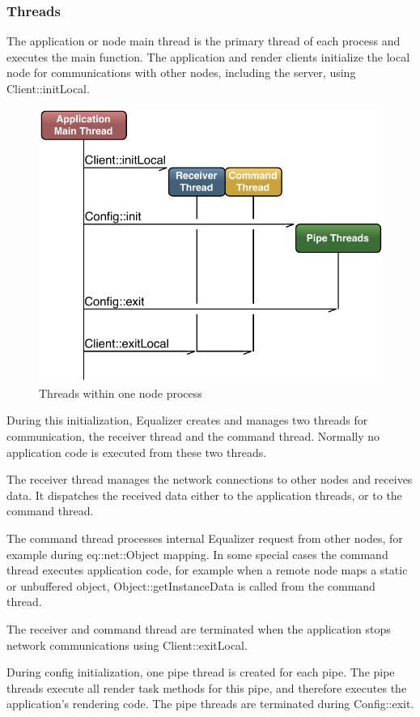\documentclass[10pt,a4]{scrartcl}
\begin{document}
\subsubsection{Threads}

The application or node main thread is the primary thread of each
process and executes the \textsf{main} function. The application and
render clients initialize the local node for communications with other
nodes, including the server, using \textsf{Client::initLocal}.

\begin{figure}
  \includegraphics[width=.618\textwidth]{images/threads.pdf}
  {\caption{\label{fThreads}Threads within one node process}}
\end{figure}
During this initialization, Equalizer creates and manages two threads
for communication, the receiver thread and the command thread. Normally
no application code is executed from these two threads.

The receiver thread manages the network connections to other nodes and
receives data. It dispatches the received data either to the application
threads, or to the command thread.

The command thread processes internal Equalizer request from other
nodes, for example during \textsf{eq::net::Object} mapping. In some
special cases the command thread executes application code, for example
when a remote node maps a static or unbuffered object,
\textsf{Object::getInstanceData} is called from the command thread.

The receiver and command thread are terminated when the application
stops network communications using \textsf{Client::exitLocal}.

During config initialization, one pipe thread is created for each
pipe. The pipe threads execute all render task methods for this pipe,
and therefore executes the application's rendering code. The pipe
threads are terminated during \textsf{Config::exit}.
\end{document}
